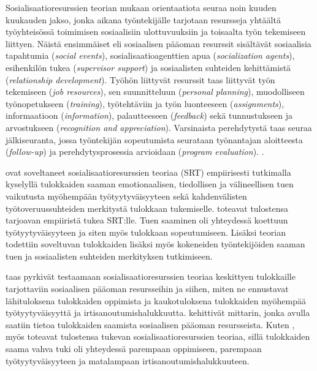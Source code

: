 \documentclass[utf8]{gradu3}
\begin{document}
Sosialisaatioresurssien teorian \parencite{saks-gruman-2012} mukaan orientaatiota seuraa noin kuuden kuukauden jakso, jonka aikana työntekijälle tarjotaan resursseja yhtäältä työyhteisössä toimimisen sosiaalisiin ulottuvuuksiin ja toisaalta työn tekemiseen liittyen. Näistä ensimmäiset eli sosiaalisen pääoman resurssit sisältävät sosiaalisia tapahtumia (\textit{social events}), sosialisaatioagenttien apua (\textit{socialization agents}), esihenkilön tukea (\textit{supervisor support}) ja sosiaalisten suhteiden kehittämistä (\textit{relationship development}). Työhön liittyvät resurssit taas liittyvät työn tekemiseen (\textit{job resources}), sen suunnitteluun (\textit{personal planning}), muodolliseen työnopetukseen (\textit{training}), työtehtäviin ja työn luonteeseen (\textit{assignments}), informaatioon (\textit{information}), palautteeseen (\textit{feedback}) sekä tunnustukseen ja arvostukseen (\textit{recognition and appreciation}). Varsinaista perehdytystä taas seuraa jälkiseuranta, jossa työntekijän sopeutumista seurataan työnantajan aloitteesta (\textit{follow-up}) ja perehdytysprosessia arvioidaan (\textit{program evaluation}). \parencite{saks-gruman-2012}.

\textcite{cranmer-ym-2016} ovat soveltaneet sosialisaatioresurssien teoriaa (SRT) empiirisesti tutkimalla kyselyllä tulokkaiden saaman emotionaalisen, tiedollisen ja välineellisen tuen vaikutusta myöhempään työtyytyväisyyteen sekä kahdenvälisten työtoveruussuhteiden merkitystä tulokkaan tukemiselle. \textcite{cranmer-ym-2016} toteavat tulostensa tarjoavan empiiristä tukea SRT:lle. Tuen saaminen oli yhteydessä koettuun työtyytyväisyyteen ja siten myös tulokkaan sopeutumiseen. Lisäksi teorian todettiin soveltuvan tulokkaiden lisäksi myös kokeneiden työntekijöiden saaman tuen ja sosiaalisten suhteiden merkityksen tutkimiseen. 

\textcite{harris-ym-2022} taas pyrkivät testaamaan sosialisaatioresurssien teoriaa keskittyen tulokkaille tarjottaviin sosiaalisen pääoman resursseihin ja siihen, miten ne ennustavat lähituloksena tulokkaiden oppimista ja kaukotuloksena tulokkaiden myöhempää työtyytyväisyyttä ja irtisanoutumishalukkuutta. \textcite{harris-ym-2022} kehittivät mittarin, jonka avulla saatiin tietoa tulokkaiden saamista sosiaalisen pääoman resursseista. Kuten \textcite{cranmer-ym-2016}, myös \textcite{harris-ym-2022} toteavat tulostensa tukevan sosialisaatioresurssien teoriaa, sillä tulokkaiden saama vahva tuki oli yhteydessä parempaan oppimiseen, parempaan työtyytyväisyyteen ja matalampaan irtisanoutumishalukkuuteen.
\end{document}
